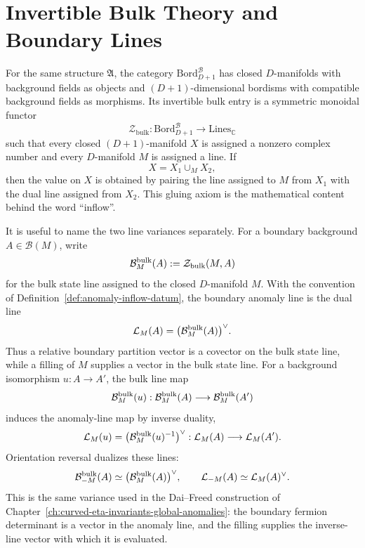 \section{Invertible Bulk Theory and Boundary Lines}
\label{sec:inflow-bulk-boundary-lines}

For the same structure \(\mathfrak A\), the category
\(\mathrm{Bord}_{D+1}^{\mathcal B}\) has closed \(D\)-manifolds with
background fields as objects and \((D+1)\)-dimensional bordisms with
compatible background fields as morphisms.  Its invertible bulk entry is a
symmetric monoidal functor
\[
  \mathcal Z_{\mathrm{bulk}}:
  \mathrm{Bord}_{D+1}^{\mathcal B}
  \longrightarrow
  \mathrm{Lines}_{\mathbb C}
\]
such that every closed \((D+1)\)-manifold \(X\) is assigned a nonzero complex
number and every \(D\)-manifold \(M\) is assigned a line.  If
\[
  X=X_1\cup_M X_2,
\]
then the value on \(X\) is obtained by pairing the line assigned to \(M\) from
\(X_1\) with the dual line assigned from \(X_2\).  This gluing axiom is the
mathematical content behind the word ``inflow''.

It is useful to name the two line variances separately.  For a boundary
background \(A\in\mathcal B(M)\), write
\[
  \mathcal B^{\rm bulk}_M(A)
  :=
  \mathcal Z_{\rm bulk}(M,A)
\]
for the bulk state line assigned to the closed \(D\)-manifold \(M\).  With
the convention of Definition~\ref{def:anomaly-inflow-datum}, the boundary
anomaly line is the dual line
\begin{equation}
  \mathcal L_M(A)
  =
  \bigl(\mathcal B^{\rm bulk}_M(A)\bigr)^\vee .
  \label{eq:inflow-boundary-line-bulk-dual}
\end{equation}
Thus a relative boundary partition vector is a covector on the bulk state
line, while a filling of \(M\) supplies a vector in the bulk state line.
For a background isomorphism \(u:A\to A'\), the bulk line map
\[
  \mathcal B^{\rm bulk}_M(u):
  \mathcal B^{\rm bulk}_M(A)\longrightarrow
  \mathcal B^{\rm bulk}_M(A')
\]
induces the anomaly-line map by inverse duality,
\[
  \mathcal L_M(u)
  =
  \bigl(\mathcal B^{\rm bulk}_M(u)^{-1}\bigr)^\vee:
  \mathcal L_M(A)\longrightarrow \mathcal L_M(A').
\]
Orientation reversal dualizes these lines:
\[
  \mathcal B^{\rm bulk}_{-M}(A)\simeq
  \bigl(\mathcal B^{\rm bulk}_M(A)\bigr)^\vee,
  \qquad
  \mathcal L_{-M}(A)\simeq \mathcal L_M(A)^\vee .
\]
This is the same variance used in the Dai--Freed construction of
Chapter~\ref{ch:curved-eta-invariants-global-anomalies}: the boundary
fermion determinant is a vector in the anomaly line, and the filling supplies
the inverse-line vector with which it is evaluated.

